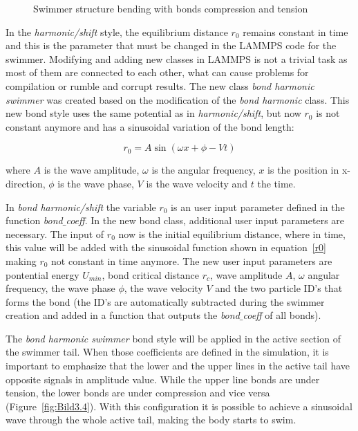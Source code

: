 \begin{figure}[H]
\centering
  \begin{footnotesize}
  
  \caption[Swimmer structure bending with bonds compression and tension]{Swimmer structure bending with bonds compression and tension}
  \label{fig:Bild3.3}
  \end{footnotesize}
\end{figure} 

In the \textit{harmonic/shift} style, the equilibrium distance $r_{0}$ remains constant in time and this is the parameter that must be changed in the LAMMPS code for the swimmer. Modifying and
adding new classes in LAMMPS is not a trivial task as most of them are connected to each other, what can cause problems for compilation or rumble and corrupt results. The new class
\textit{bond harmonic swimmer} was created based on the modification of the \textit{bond harmonic} class. This new  bond style uses the same potential as in \textit{harmonic/shift}, but now $r_{0}$
is not constant anymore and has a sinusoidal variation of the bond length:

\begin{equation}\label{r0}
  r_{0} = A  \sin (\omega x + \phi - Vt)
\end{equation}

where $A$ is the wave amplitude, $\omega$ is the angular frequency, $x$ is the position in x-direction, $\phi$ is the wave phase, $V$ is the wave velocity and $t$ the time.\par
In \textit{bond harmonic/shift} the variable $r_{0}$ is an user input parameter defined in the function \textit{bond$\_$coeff}. In the new bond class, additional user input parameters are 
necessary. The input of $r_{0}$ now is the initial equilibrium distance, where in time, this value will be added with the sinusoidal function shown in equation~\ref{r0} making $r_{0}$
not constant in time anymore. The new user input parameters are pontential energy $U_{min}$, bond critical distance $r_{c}$, wave amplitude $A$, $\omega$ angular frequency,
the wave phase $\phi$, the wave velocity $V$ and the two particle ID's that forms the bond (the ID's are automatically subtracted during the swimmer creation and added in a function
that outputs the \textit{bond$\_$coeff} of all bonds).\par
The \textit{bond harmonic swimmer} bond style will be applied in the  active section of the swimmer tail. When those coefficients are defined in the simulation, it is important to
emphasize that the lower and the upper lines in the active tail have opposite signals in amplitude value. While the upper line bonds are under tension, the lower bonds are under 
compression and vice versa (Figure~\ref{fig:Bild3.4}). With this configuration it is possible to achieve a sinusoidal wave through the whole active tail, making the body starts to swim.



